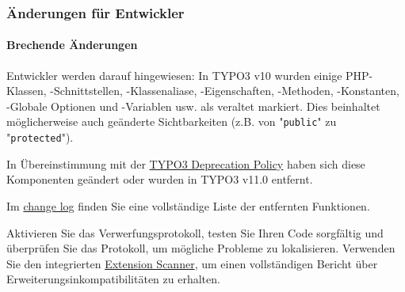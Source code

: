 %

\begin{frame}[fragile]
	\frametitle{Änderungen für Entwickler}
	\framesubtitle{Brechende Änderungen}

	\small
		Entwickler werden darauf hingewiesen: In TYPO3 v10 wurden einige PHP-Klassen, -Schnittstellen,
		-Klassenaliase, -Eigenschaften, -Methoden, -Konstanten, -Globale Optionen und -Variablen usw.
		als veraltet markiert. Dies beinhaltet möglicherweise auch geänderte Sichtbarkeiten (z.B. von
		"\texttt{public}" zu "\texttt{protected}").

		\vspace{0.2cm}

		In Übereinstimmung mit der
		\href{https://typo3.org/article/typo3-deprecation-policy}{TYPO3 Deprecation Policy}
		haben sich diese Komponenten geändert oder wurden in TYPO3 v11.0 entfernt.

		\vspace{0.2cm}

		Im \href{https://docs.typo3.org/c/typo3/cms-core/master/en-us/Changelog/master/Breaking-91473-DeprecatedFunctionalityRemoved.html}{change log}
		finden Sie eine vollständige Liste der entfernten Funktionen.

		\vspace{0.2cm}

		Aktivieren Sie das Verwerfungsprotokoll, testen Sie Ihren Code sorgfältig und überprüfen Sie das Protokoll,
		um mögliche Probleme zu lokalisieren. Verwenden Sie den integrierten
		\href{https://docs.typo3.org/m/typo3/reference-coreapi/master/en-us/ApiOverview/ExtensionScanner/Index.html}{Extension Scanner},
		um einen vollständigen Bericht über Erweiterungsinkompatibilitäten zu erhalten.

	\normalsize

\end{frame}

